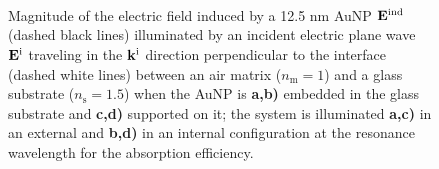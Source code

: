 \begin{figure}[t!]\centering
   \def\svgwidth{.75 \textwidth}
   \footnotesize
   \\[-32.6em]
   \hspace*{-.25\textwidth}
       \begin{subfigure}{.25\textwidth}\caption{ } \label{sfig:Near:EE}\end{subfigure}%
       \begin{subfigure}{.36\textwidth}\caption{ } \label{sfig:Near:EI}\end{subfigure}\\[13em]
   \hspace*{-.25\textwidth}
       \begin{subfigure}{.25\textwidth}\caption{ } \label{sfig:Near:SE}\end{subfigure}%
       \begin{subfigure}{.36\textwidth}\caption{ } \label{sfig:Near:SI}\end{subfigure}\\[15em]
   \caption[Induced Electric Field of a 12.5 nm Au Spherical NP embbeded into (supported on) a substrate illuminated at a normal incidence]{Magnitude of the electric field induced by a 12.5 nm AuNP  $\vb{E}^\text{ind}$ (dashed black lines) illuminated by an incident electric plane wave $\vb{E}^\text{i}$ traveling in the $\vb{k}^\text{i}$ direction perpendicular to the interface  (dashed white lines) between an air matrix ($n_\text{m} = 1$) and a glass substrate ($n_\text{s} = 1.5$) when the AuNP is  \textbf{a,b)} embedded in the glass substrate and \textbf{c,d)} supported on it; the system is illuminated \textbf{a,c)}  in an external and \textbf{b,d)} in an internal configuration at the resonance wavelength for the absorption efficiency.}
   \label{fig:Near:IntExt}
 \end{figure}

